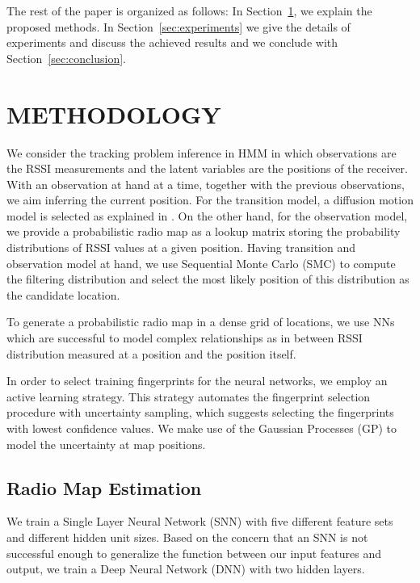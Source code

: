 \documentclass{article}
\begin{document}
	
	The rest of the paper is organized as follows: In Section~\ref{sec:methodology}, we explain the proposed methods. In Section~\ref{sec:experiments} we give the details of experiments and discuss the achieved results and we conclude with Section~\ref{sec:conclusion}.
	
	\section{METHODOLOGY}
	\label{sec:methodology}
	We consider the tracking problem inference in HMM \cite{barberBRML2012} in which observations are the RSSI measurements and the latent variables are the positions of the receiver. With an observation at hand at a time, together with the previous observations, we aim inferring the current position. For the transition model, a diffusion motion model is selected as explained in \cite{Ser2017}. On the other hand, for the observation model, we provide a probabilistic radio map as a lookup matrix storing the probability distributions of RSSI values at a given position. Having transition and observation model at hand, we use Sequential Monte Carlo (SMC) to compute the filtering distribution and select the most likely position of this distribution as the candidate location.
	
	To generate a probabilistic radio map in a dense grid of locations, we use NNs which are successful to model complex relationships as in between RSSI distribution measured at a position and the position itself. 
	
	In order to select training fingerprints for the neural networks, we employ an active learning strategy. %
	This strategy automates the fingerprint selection procedure with uncertainty sampling, which suggests selecting the fingerprints with lowest confidence values. We make use of the Gaussian Processes (GP) to model the uncertainty at map positions.
	
	\subsection{Radio Map Estimation}
	We train a Single Layer Neural Network (SNN) with five different feature sets and different hidden unit sizes. Based on the concern that an SNN is not successful enough to generalize the function between our input features and output, we train a Deep Neural Network (DNN) with two hidden layers.
		
\end{document}

